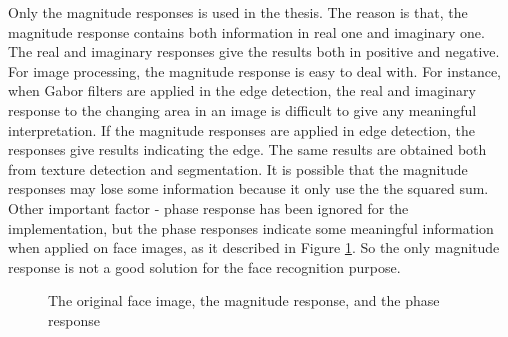 Only the magnitude responses is used in the thesis. The reason is that, the magnitude response contains both information in real one and imaginary one. The real and imaginary responses give the results both in positive and negative. For image processing, the magnitude response is easy to deal with. For instance, when Gabor filters are applied in the edge detection, the real and imaginary response to the changing area in an image is difficult to give any meaningful interpretation. If the magnitude responses are applied in edge detection, the responses give results indicating the edge. The same results are obtained both from texture detection and segmentation. 
It is possible that the magnitude responses may lose some information because it only use the the squared sum. Other important factor - phase response has been ignored for the implementation, but the phase responses indicate some meaningful information when applied on face images, as it described in \mbox{Figure} \ref{fig:magandphase}. So the only magnitude response is not a good solution for the face recognition purpose.
\begin{figure}[ht]
\begin{center}
\caption{The original face image, the magnitude response, and the phase response}
\label{fig:magandphase}
\end{center}
\end{figure} 

